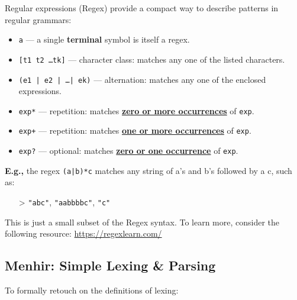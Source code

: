 \begin{Def}

    \label{def:regex}
    Regular expressions (Regex) provide a compact way to describe patterns in regular grammars:
    
    \begin{itemize}
        \item \texttt{a} — a single \textbf{terminal} symbol is itself a regex.
       
    
        \item \texttt{[t1 t2 \ldots tk]} — character class: matches any one of the listed characters.
        
    
        \item \texttt{(e1 | e2 | \ldots | ek)} — alternation: matches any one of the enclosed expressions.
       
    
        \item \texttt{exp*} — repetition: matches \underline{\textbf{zero or more occurrences}} of \texttt{exp}.
      
    
        \item \texttt{exp+} — repetition: matches \underline{\textbf{one or more occurrences}} of \texttt{exp}.
        
    
        \item \texttt{exp?} — optional: matches \underline{\textbf{zero or one occurrence}} of \texttt{exp}.
        
    \end{itemize}
    
    \noindent
    \textbf{E.g.,} the regex \texttt{(a|b)*c} matches any string of a's and b's followed by a c, such as:
    \begin{itemize}
        \item[>] \texttt{"abc"}, \texttt{"aabbbbc"}, \texttt{"c"}
    \end{itemize}
   
    \noindent
    This is just a small subset of the Regex syntax. To learn more, consider the following resource:
    \url{https://regexlearn.com/}
    \end{Def}
\newpage 
\subsection{Menhir: Simple Lexing \& Parsing }
\noindent
To formally retouch on the definitions of lexing:


